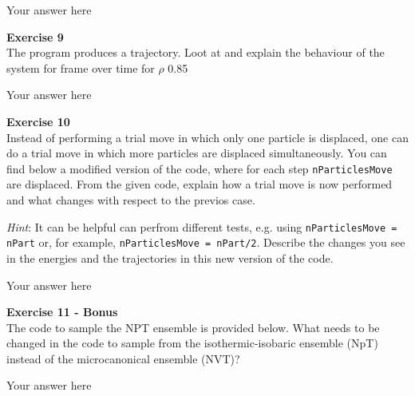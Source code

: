\documentclass{article}
\begin{document}
Your answer here

\begin{mdframed}
\textbf{Exercise 9}\\
The program produces a trajectory. Loot at and explain the behaviour of the system for frame over time for $\rho$ 0.85
\end{mdframed}

Your answer here

\begin{mdframed}
\textbf{Exercise 10}\\
Instead of performing a trial move in which only one particle is displaced, one can do a trial move in which more particles are
displaced simultaneously. You can find below a modified version of the code, where for each step \texttt{nParticlesMove} are displaced.
From the given code, explain how a trial move is now performed and what changes with respect to the previos case.

\textit{Hint}: It can be helpful can perfrom different tests, e.g. using \texttt{nParticlesMove = nPart} or, for example, \texttt{nParticlesMove = nPart/2}. Describe the changes you see in the energies and the trajectories in this new version of the code.
\end{mdframed}

Your answer here

\begin{mdframed}
\textbf{Exercise 11 - Bonus}\\
The code to sample the NPT ensemble is provided below. What needs to be changed in the code to sample from the isothermic-isobaric ensemble (NpT) instead of the microcanonical ensemble (NVT)?
\end{mdframed}

Your answer here

\end{document}

